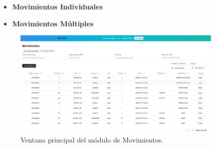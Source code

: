 \begin{itemize}
    \item \textbf{Movimientos Individuales}
    \item \textbf{Movimientos Múltiples}
\end{itemize}
\begin{figure}[H]
    \centering
    \includegraphics[width=0.9\textwidth]{imgs/Almacen_General/movimientos/movimientos_individuales/movimientos_crear.png}
    \caption{Ventana principal del módulo de Movimientos.}
    \label{fig:movimientos}
\end{figure}






